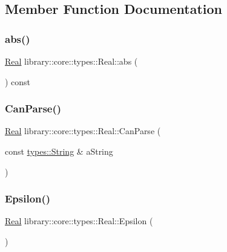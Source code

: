 \subsection{Member Function Documentation}
\mbox{\label{classlibrary_1_1core_1_1types_1_1_real_aca1aed64224745a0aa2fcf93c6faa0f9}} 
\subsubsection{\texorpdfstring{abs()}{abs()}}
{\footnotesize\ttfamily \mbox{\hyperlink{classlibrary_1_1core_1_1types_1_1_real}{Real}} library\+::core\+::types\+::\+Real\+::abs (\begin{DoxyParamCaption}{ }\end{DoxyParamCaption}) const}

\mbox{\label{classlibrary_1_1core_1_1types_1_1_real_a179d3db1c67dff26272317ca850046cf}} 
\subsubsection{\texorpdfstring{CanParse()}{CanParse()}}
{\footnotesize\ttfamily \mbox{\hyperlink{classlibrary_1_1core_1_1types_1_1_real}{Real}} library\+::core\+::types\+::\+Real\+::\+Can\+Parse (\begin{DoxyParamCaption}\item[{const \mbox{\hyperlink{classlibrary_1_1core_1_1types_1_1_string}{types\+::\+String}} \&}]{a\+String }\end{DoxyParamCaption})\hspace{0.3cm}{\ttfamily [static]}}

\mbox{\label{classlibrary_1_1core_1_1types_1_1_real_a5f3b76a5055cb042c25448b873e39663}} 
\subsubsection{\texorpdfstring{Epsilon()}{Epsilon()}}
{\footnotesize\ttfamily \mbox{\hyperlink{classlibrary_1_1core_1_1types_1_1_real}{Real}} library\+::core\+::types\+::\+Real\+::\+Epsilon (\begin{DoxyParamCaption}{ }\end{DoxyParamCaption})\hspace{0.3cm}{\ttfamily [static]}}


